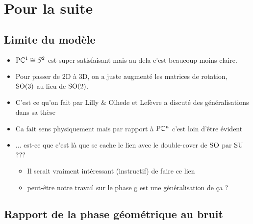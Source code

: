 \section{\todo Pour la suite}\label{sec:2lasuite}


\subsection{\todo Limite du modèle}\label{subsec:limite2model}

\begin{itemize}
	
	\item $\text{\normalfont P}\mathbb{C}^{1} \cong S^2$ est super satisfaisant mais au dela c'est beaucoup moins claire.
	
	\item Pour passer de 2D à 3D, on a juste augmenté les matrices de rotation, \ie~$\text{\normalfont SO}(3)$ au lieu de $\text{\normalfont SO}(2)$. 
	
	\item C'est ce qu'on fait par Lilly \& Olhede \cite{lilly_modulated_2011} et Lefèvre a discuté des généralisations dans sa thèse \cite{lefevre_polarization_2021}
	
	\item Ca fait sens physiquement mais par rapport à $\text{\normalfont P}\mathbb{C}^{n}$ c'est loin d'être évident
	
	\item ... est-ce que c'est là que se cache le lien avec le double-cover de $\text{\normalfont SO}$ par $\text{\normalfont SU}$ ???
	\begin{itemize}
		\item Il serait vraiment intéressant (instructif) de faire ce lien 
		
		\item peut-être notre travail sur le phase g est une généralisation de ça ? 
	\end{itemize}
	
\end{itemize}



\subsection{\todo Rapport de la phase géométrique au bruit}\label{subsec:rapportObruit}

